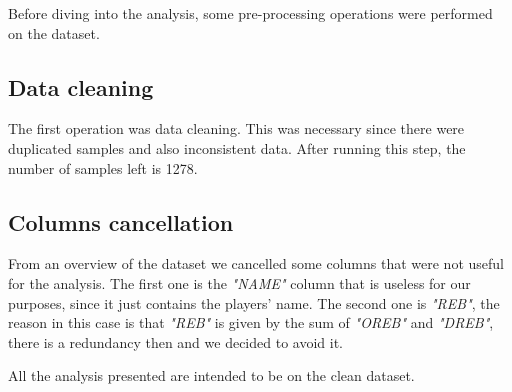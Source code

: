 Before diving into the analysis, some pre-processing operations were performed on the dataset.

\subsection{Data cleaning}
The first operation was data cleaning. This was necessary since there were duplicated samples and also inconsistent data.
After running this step, the number of samples left is 1278.

\subsection{Columns cancellation}
From an overview of the dataset we cancelled some columns that were not useful for the analysis.
The first one is the \textit{"NAME"} column that is useless for our purposes, since it just contains the players' name.
The second one is \textit{"REB"}, the reason in this case is that \textit{"REB"} is given by the sum of \textit{"OREB"} and \textit{"DREB"}, there is a redundancy then and we decided to avoid it.
 
\noindent
All the analysis presented are intended to be on the clean dataset.